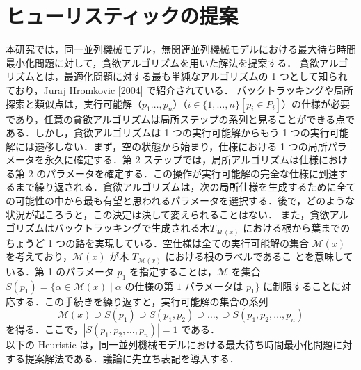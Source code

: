 \documentclass[12pt]{optlab-bachelor}
\begin{document}
\section{ヒューリスティックの提案}\label{5_s_1}
本研究では，同一並列機械モデル，無関連並列機械モデルにおける最大待ち時間最小化問題に対して，貪欲アルゴリズムを用いた解法を提案する．
貪欲アルゴリズムとは，最適化問題に対する最も単純なアルゴリズムの 1 つとして知られており，Juraj Hromkovic [2004] \cite{greedy} で紹介されている．
バックトラッキングや局所探索と類似点は，実行可能解（$p_1\ldots,p_n$）（$i \in \{1,\ldots,n\}[p_i \in P_i]$）の仕様が必要であり，任意の貪欲アルゴリズムは局所ステップの系列と見ることができる点である．しかし，貪欲アルゴリズムは 1 つの実行可能解からもう 1 つの実行可能解には遷移しない．まず，空の状態から始まり，仕様における 1 つの局所パラメータを永久に確定する．第 2 ステップでは，局所アルゴリズムは仕様における第 2 のパラメータを確定する．この操作が実行可能解の完全な仕様に到達するまで繰り返される．貪欲アルゴリズムは，次の局所仕様を生成するために全ての可能性の中から最も有望と思われるパラメータを選択する．後で，どのような状況が起ころうと，この決定は決して変えられることはない．
また，貪欲アルゴリズムはバックトラッキングで生成される木$T_{\mathcal{M}(x)}$ における根から葉までのちょうど 1 つの路を実現している．空仕様は全ての実行可能解の集合 $\mathcal{M}(x)$ を考えており，$\mathcal{M}(x)$ が木 $T_{\mathcal{M}(x)}$ における根のラベルであるこ
とを意味している．第 1 のパラメータ $p_1$ を指定することは，$\mathcal{M}$ を集合 $S(p_1) = \{\alpha \in \mathcal{M}(x) \mid \alpha \text{ の仕様の第 1 パラメータは } p_1\}$ に制限することに対応する．この手続きを繰り返すと，実行可能解の集合の系列
$$\mathcal{M}(x) \supseteq S(p_1) \supseteq S(p_1,p_2) \supseteq
\ldots, \supseteq S(p_1,p_2,\ldots,p_n)$$
を得る．ここで，$|S(p_1,p_2,\ldots,p_n)| = 1$ である．\\

\noindent 以下の {\sc Heuristic} は，同一並列機械モデルにおける最大待ち時間最小化問題に対する提案解法である．議論に先立ち表記を導入する．
\end{document}
